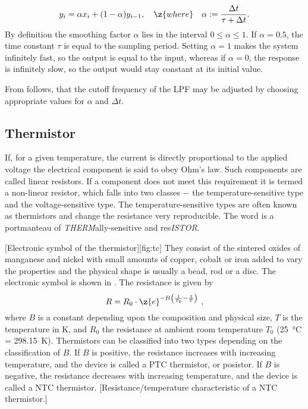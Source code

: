%
\begin{equation}\label{eq:lpf1}
  y_i = \alpha x_i + (1-\alpha)y_{i-1},\hspace*{1em}\z{ where } \hspace*{1em} \alpha:= \dfrac{\Delta t}{\tau + \Delta t}.
\end{equation}
%
By definition the smoothing factor $\alpha$ lies in the interval $0\le\alpha\le1$. If $\alpha=0.5$, the time constant $\tau$ is equal to the sampling period. Setting $\alpha = 1$ makes the system infinitely fast, so the output is equal to the input, whereas if $\alpha = 0$, the response is infinitely slow, so the output would stay constant at its initial value.\par 
%
From  follows, that the cutoff frequency of the \ac{LPF} may be adjusted by choosing appropriate values for $\alpha$ and $\Delta t$.
%
\subsection{Thermistor}\label{sec:therm}
If, for a given temperature, the current is directly proportional to the applied voltage the electrical component is said to obey Ohm's law. Such components are called linear resistors. If a component does not meet this requirement it is termed a non-linear resistor, which falls into two classes $-$ the temperature-sensitive type and the voltage-sensitive type. The temperature-sensitive types are often known as thermistors and change the resistance very reproducible. The word is a portmanteau of \textit{THERM}ally-sensitive and res\textit{ISTOR}.\par
%
[Electronic symbol of the thermistor][fig:tc]
%
They consist of the sintered oxides of manganese and nickel with small amounts of copper, cobalt or iron added to vary the properties and the physical shape is usually a bead, rod or a disc. The electronic symbol is shown in . The resistance is given by
%
\begin{equation}\label{eq:th}
	R = R_{0}\cdot\z{e}^{-B\left(\frac{1}{T_{0}} - \frac{1}{T}\right)}\ ,
\end{equation}
%
where $B$ is a constant depending upon the composition and physical size, $T$ is the temperature in \si{\kelvin}, and $R_{0}$ the resistance at ambient room temperature $T_{0}$ (\SI{25}{\celsius} = \SI{298.15}{\kelvin}). Thermistors can be classified into two types depending on the classification of $B$. If $B$ is positive, the resistance increases with increasing temperature, and the device is called a \ac{PTC} thermistor, or posistor. If $B$ is negative, the resistance decreases with increasing temperature, and the device is called a \ac{NTC} thermistor.
%
[Resistance/temperature characteristic of a \ac{NTC} thermistor.]
%
